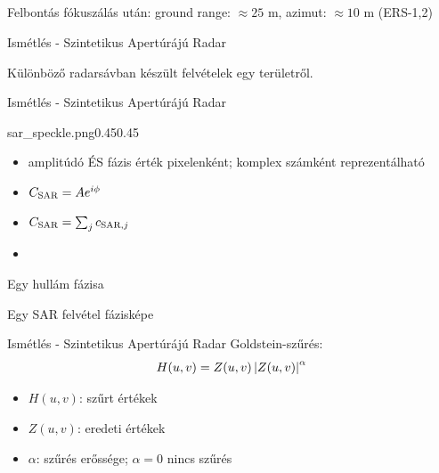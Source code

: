 \documentclass[aspectratio=169]{beamer}
\begin{document}
\subsection{\ft}

\begin{frame}{\ft}
    \begin{minic}{0.8}
        
        \centering
        Felbontás fókuszálás után: ground range: $\approx 25$ m, azimut: $\approx 10$ m (ERS-1,2)
    \end{minic}
\end{frame}


\def\ft{Ismétlés - Szintetikus Apertúrájú Radar}

\begin{frame}{\ft}
    \begin{minic}{0.85}
        
        \centering
        Különböző radarsávban készült felvételek egy területről.
    \end{minic}
\end{frame}


\begin{frame}{\ft}
    \begin{figp}{sar_speckle.png}{}{0.45}{0.45}
        \begin{itemize}
            \item amplitúdó ÉS fázis érték pixelenként; komplex számként reprezentálható
            \item $C_{\text{SAR}} = A e^{i\phi}$
            \item $C_{\text{SAR}} = \sum_j c_{\text{SAR},j}$
            \item 
        \end{itemize}
    \end{figp}
\end{frame}

\begin{frame}{Egy hullám fázisa}
    
\end{frame}


\begin{frame}{Egy SAR felvétel fázisképe}
    \begin{minic}{0.5}
    \end{minic}
\end{frame}


\begin{frame}{\ft}
    Goldstein-szűrés:
    \[
        H(u,v) = Z(u,v) \left|Z(u,v)\right|^{\alpha}
    \]
    \begin{itemize}
        \item $H(u,v)$: szűrt értékek
        \item $Z(u,v)$: eredeti értékek
        \item $\alpha$: szűrés erőssége; $\alpha = 0$ nincs szűrés
    \end{itemize}
\end{frame}

%
\end{document}
